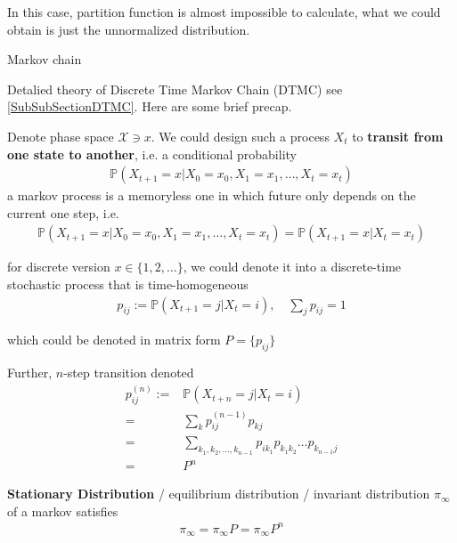     In this case, partition function is almost impossible to calculate, what we could obtain is just the unnormalized distribution.
    
\begin{point}
    Markov chain
\end{point}

    Detalied theory of Discrete Time Markov Chain (DTMC) see \autoref{SubSubSectionDTMC}. Here are some brief precap.

    Denote phase space $ \mathcal{X}\ni x $. We could design such a process $ X_t $ to \textbf{transit from one state to another}, i.e. a conditional probability
    \begin{align}
        \mathbb{P}\left( X_{t+1}=x|X_0=x_0,X_1=x_1,\ldots ,X_t=x_t \right)  
    \end{align}
    a markov process is a memoryless one in which future only depends on the current one step, i.e.
    \begin{align}
        \mathbb{P}\left( X_{t+1}=x|X_0=x_0,X_1=x_1,\ldots ,X_t=x_t \right)  =\mathbb{P}\left( X_{t+1}=x|X_t=x_t \right) 
    \end{align}

    for discrete version $ x\in\{1,2,\ldots\} $, we could denote it into a discrete-time stochastic process that is time-homogeneous
    \begin{align}
        p_{ij}:= \mathbb{P}\left( X_{t+1}=j|X_{t}=i \right)  ,\quad \sum_{j}p_{ij}=1
    \end{align}

    which could be denoted in matrix form $ P=\{p_{ij}\} $
    
    Further, $ n $-step transition denoted
    \begin{align}
        p^{(n)}_{ij}:=&\mathbb{P}\left( X_{t+n}=j|X_t=i \right) \\
        =&\sum_{k}p^{(n-1)}_{ij}p_{kj}\\
        =&\sum_{k_1,k_2,\ldots ,k_{n-1}}p_{ik_1}p_{k_1k_2}\ldots p_{k_{n-1}j}\\
        =&P^n
    \end{align}

    \textbf{Stationary Distribution} / equilibrium distribution / invariant distribution $ \pi_\infty $ of a markov satisfies
    \begin{align}
         \pi_\infty=\pi_\infty P=\pi_{\infty}P^n
    \end{align}
    
